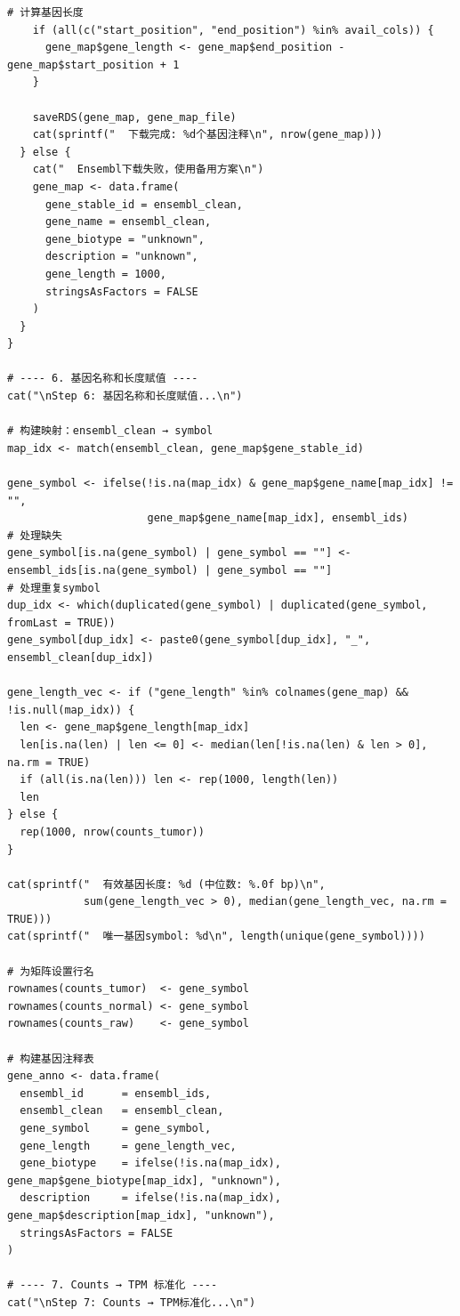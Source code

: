 \documentclass[12pt,a4paper]{ctexart}
\begin{document}
\begin{lstlisting}[caption={01_data_preprocessing}, basicstyle=\ttfamily\scriptsize]
    # 计算基因长度
    if (all(c("start_position", "end_position") %in% avail_cols)) {
      gene_map$gene_length <- gene_map$end_position - gene_map$start_position + 1
    }
    
    saveRDS(gene_map, gene_map_file)
    cat(sprintf("  下载完成: %d个基因注释\n", nrow(gene_map)))
  } else {
    cat("  Ensembl下载失败，使用备用方案\n")
    gene_map <- data.frame(
      gene_stable_id = ensembl_clean,
      gene_name = ensembl_clean,
      gene_biotype = "unknown",
      description = "unknown",
      gene_length = 1000,
      stringsAsFactors = FALSE
    )
  }
}

# ---- 6. 基因名称和长度赋值 ----
cat("\nStep 6: 基因名称和长度赋值...\n")

# 构建映射：ensembl_clean → symbol
map_idx <- match(ensembl_clean, gene_map$gene_stable_id)

gene_symbol <- ifelse(!is.na(map_idx) & gene_map$gene_name[map_idx] != "",
                      gene_map$gene_name[map_idx], ensembl_ids)
# 处理缺失
gene_symbol[is.na(gene_symbol) | gene_symbol == ""] <- ensembl_ids[is.na(gene_symbol) | gene_symbol == ""]
# 处理重复symbol
dup_idx <- which(duplicated(gene_symbol) | duplicated(gene_symbol, fromLast = TRUE))
gene_symbol[dup_idx] <- paste0(gene_symbol[dup_idx], "_", ensembl_clean[dup_idx])

gene_length_vec <- if ("gene_length" %in% colnames(gene_map) && !is.null(map_idx)) {
  len <- gene_map$gene_length[map_idx]
  len[is.na(len) | len <= 0] <- median(len[!is.na(len) & len > 0], na.rm = TRUE)
  if (all(is.na(len))) len <- rep(1000, length(len))
  len
} else {
  rep(1000, nrow(counts_tumor))
}

cat(sprintf("  有效基因长度: %d (中位数: %.0f bp)\n",
            sum(gene_length_vec > 0), median(gene_length_vec, na.rm = TRUE)))
cat(sprintf("  唯一基因symbol: %d\n", length(unique(gene_symbol))))

# 为矩阵设置行名
rownames(counts_tumor)  <- gene_symbol
rownames(counts_normal) <- gene_symbol
rownames(counts_raw)    <- gene_symbol

# 构建基因注释表
gene_anno <- data.frame(
  ensembl_id      = ensembl_ids,
  ensembl_clean   = ensembl_clean,
  gene_symbol     = gene_symbol,
  gene_length     = gene_length_vec,
  gene_biotype    = ifelse(!is.na(map_idx), gene_map$gene_biotype[map_idx], "unknown"),
  description     = ifelse(!is.na(map_idx), gene_map$description[map_idx], "unknown"),
  stringsAsFactors = FALSE
)

# ---- 7. Counts → TPM 标准化 ----
cat("\nStep 7: Counts → TPM标准化...\n")


\end{lstlisting}
\end{document}
